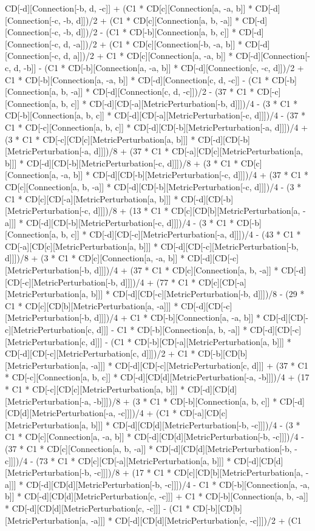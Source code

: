 CD[-d][Connection[-b, d, -c]] + (C1 * CD[c][Connection[a, -a, b]] * CD[-d][Connection[-c, -b, d]])/2 + (C1 * CD[c][Connection[a, b, -a]] * CD[-d][Connection[-c, -b, d]])/2 - (C1 * CD[-b][Connection[a, b, c]] * CD[-d][Connection[-c, d, -a]])/2 + (C1 * CD[c][Connection[-b, -a, b]] * CD[-d][Connection[-c, d, a]])/2 + C1 * CD[c][Connection[a, -a, b]] * CD[-d][Connection[-c, d, -b]] - (C1 * CD[-b][Connection[a, -a, b]] * CD[-d][Connection[c, -c, d]])/2 + C1 * CD[-b][Connection[a, -a, b]] * CD[-d][Connection[c, d, -c]] - (C1 * CD[-b][Connection[a, b, -a]] * CD[-d][Connection[c, d, -c]])/2 - (37 * C1 * CD[-c][Connection[a, b, c]] * CD[-d][CD[-a][MetricPerturbation[-b, d]]])/4 - (3 * C1 * CD[-b][Connection[a, b, c]] * CD[-d][CD[-a][MetricPerturbation[-c, d]]])/4 - (37 * C1 * CD[-c][Connection[a, b, c]] * CD[-d][CD[-b][MetricPerturbation[-a, d]]])/4 + (3 * C1 * CD[-c][CD[c][MetricPerturbation[a, b]]] * CD[-d][CD[-b][MetricPerturbation[-a, d]]])/8 + (37 * C1 * CD[-a][CD[c][MetricPerturbation[a, b]]] * CD[-d][CD[-b][MetricPerturbation[-c, d]]])/8 + (3 * C1 * CD[c][Connection[a, -a, b]] * CD[-d][CD[-b][MetricPerturbation[-c, d]]])/4 + (37 * C1 * CD[c][Connection[a, b, -a]] * CD[-d][CD[-b][MetricPerturbation[-c, d]]])/4 - (3 * C1 * CD[c][CD[-a][MetricPerturbation[a, b]]] * CD[-d][CD[-b][MetricPerturbation[-c, d]]])/8 + (13 * C1 * CD[c][CD[b][MetricPerturbation[a, -a]]] * CD[-d][CD[-b][MetricPerturbation[-c, d]]])/4 - (3 * C1 * CD[-b][Connection[a, b, c]] * CD[-d][CD[-c][MetricPerturbation[-a, d]]])/4 - (43 * C1 * CD[-a][CD[c][MetricPerturbation[a, b]]] * CD[-d][CD[-c][MetricPerturbation[-b, d]]])/8 + (3 * C1 * CD[c][Connection[a, -a, b]] * CD[-d][CD[-c][MetricPerturbation[-b, d]]])/4 + (37 * C1 * CD[c][Connection[a, b, -a]] * CD[-d][CD[-c][MetricPerturbation[-b, d]]])/4 + (77 * C1 * CD[c][CD[-a][MetricPerturbation[a, b]]] * CD[-d][CD[-c][MetricPerturbation[-b, d]]])/8 - (29 * C1 * CD[c][CD[b][MetricPerturbation[a, -a]]] * CD[-d][CD[-c][MetricPerturbation[-b, d]]])/4 + C1 * CD[-b][Connection[a, -a, b]] * CD[-d][CD[-c][MetricPerturbation[c, d]]] - C1 * CD[-b][Connection[a, b, -a]] * CD[-d][CD[-c][MetricPerturbation[c, d]]] - (C1 * CD[-b][CD[-a][MetricPerturbation[a, b]]] * CD[-d][CD[-c][MetricPerturbation[c, d]]])/2 + C1 * CD[-b][CD[b][MetricPerturbation[a, -a]]] * CD[-d][CD[-c][MetricPerturbation[c, d]]] + (37 * C1 * CD[-c][Connection[a, b, c]] * CD[-d][CD[d][MetricPerturbation[-a, -b]]])/4 + (17 * C1 * CD[-c][CD[c][MetricPerturbation[a, b]]] * CD[-d][CD[d][MetricPerturbation[-a, -b]]])/8 + (3 * C1 * CD[-b][Connection[a, b, c]] * CD[-d][CD[d][MetricPerturbation[-a, -c]]])/4 + (C1 * CD[-a][CD[c][MetricPerturbation[a, b]]] * CD[-d][CD[d][MetricPerturbation[-b, -c]]])/4 - (3 * C1 * CD[c][Connection[a, -a, b]] * CD[-d][CD[d][MetricPerturbation[-b, -c]]])/4 - (37 * C1 * CD[c][Connection[a, b, -a]] * CD[-d][CD[d][MetricPerturbation[-b, -c]]])/4 - (73 * C1 * CD[c][CD[-a][MetricPerturbation[a, b]]] * CD[-d][CD[d][MetricPerturbation[-b, -c]]])/8 + (17 * C1 * CD[c][CD[b][MetricPerturbation[a, -a]]] * CD[-d][CD[d][MetricPerturbation[-b, -c]]])/4 - C1 * CD[-b][Connection[a, -a, b]] * CD[-d][CD[d][MetricPerturbation[c, -c]]] + C1 * CD[-b][Connection[a, b, -a]] * CD[-d][CD[d][MetricPerturbation[c, -c]]] - (C1 * CD[-b][CD[b][MetricPerturbation[a, -a]]] * CD[-d][CD[d][MetricPerturbation[c, -c]]])/2 + (C1 